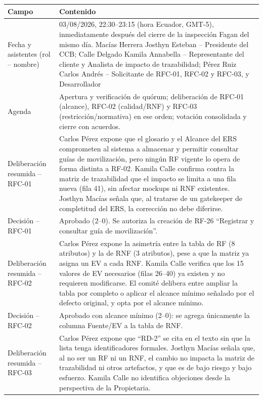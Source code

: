 \documentclass[11pt,a4paper]{article}
\begin{document}
\begin{longtable}{|p{4.5cm}|p{9.5cm}|}
\hline
\textbf{Campo} & \textbf{Contenido} \\
\hline
Fecha y asistentes (rol -- nombre) & 03/08/2026, 22:30--23:15 (hora Ecuador, GMT-5), inmediatamente después del cierre de la inspección Fagan del mismo día. Macías Herrera Josthyn Esteban -- Presidente del CCB; Calle Delgado Kamila Annabella -- Representante del cliente y Analista de impacto de trazabilidad; Pérez Ruiz Carlos Andrés -- Solicitante de RFC-01, RFC-02 y RFC-03, y Desarrollador \\
\hline
Agenda & Apertura y verificación de quórum; deliberación de RFC-01 (alcance), RFC-02 (calidad/RNF) y RFC-03 (restricción/normativa) en ese orden; votación consolidada y cierre con acuerdos. \\
\hline
Deliberación resumida -- RFC-01 & Carlos Pérez expone que el glosario y el Alcance del ERS comprometen al sistema a almacenar y permitir consultar guías de movilización, pero ningún RF vigente lo opera de forma distinta a RF-02. Kamila Calle confirma contra la matriz de trazabilidad que el impacto se limita a una fila nueva (fila 41), sin afectar mockups ni RNF existentes. Josthyn Macías señala que, al tratarse de un gatekeeper de completitud del ERS, la corrección no debe diferirse. \\
\hline
Decisión -- RFC-01 & Aprobado (2--0). Se autoriza la creación de RF-26 ``Registrar y consultar guía de movilización''. \\
\hline
Deliberación resumida -- RFC-02 & Carlos Pérez expone la asimetría entre la tabla de RF (8 atributos) y la de RNF (3 atributos), pese a que la matriz ya asigna un EV a cada RNF. Kamila Calle verifica que los 15 valores de EV necesarios (filas 26--40) ya existen y no requieren modificarse. El comité delibera entre ampliar la tabla por completo o aplicar el alcance mínimo señalado por el defecto original, y opta por el alcance mínimo. \\
\hline
Decisión -- RFC-02 & Aprobado con alcance mínimo (2--0): se agrega únicamente la columna Fuente/EV a la tabla de RNF. \\
\hline
Deliberación resumida -- RFC-03 & Carlos Pérez expone que ``RD-2'' se cita en el texto sin que la lista tenga identificadores formales. Josthyn Macías señala que, al no ser un RF ni un RNF, el cambio no impacta la matriz de trazabilidad ni otros artefactos, y que es de bajo riesgo y bajo esfuerzo. Kamila Calle no identifica objeciones desde la perspectiva de la Propietaria. \\

\end{longtable}
\end{document}
